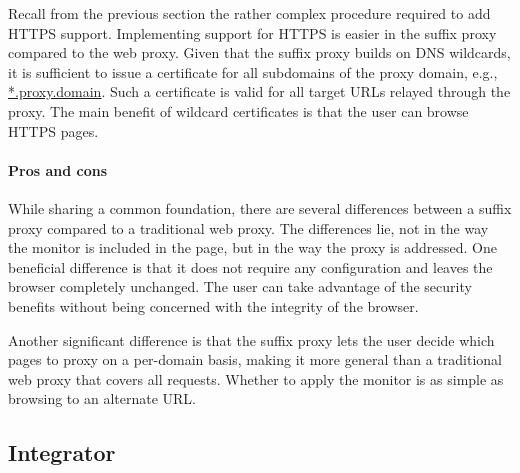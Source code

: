 \documentclass{llncs}
\newcommand{\todo}[1]{\colorbox{red}{\textcolor{white}{\sffamily\bfseries\scriptsize TODO}} \textcolor{red}{#1} \textcolor{red}{$\blacktriangleleft$}}
\begin{document}
Recall from the previous section the rather complex procedure required to add HTTPS support.
Implementing support for HTTPS is easier in the suffix proxy compared to the web proxy. 
Given that the suffix proxy builds on DNS wildcards, it is sufficient to issue a certificate
for all subdomains of the proxy domain, e.g., \url{*.proxy.domain}. Such a 
certificate is valid for all target URLs relayed through the proxy.
The main benefit of wildcard certificates is that the user can browse HTTPS pages. 

\paragraph{Pros and cons}

While sharing a common foundation, there are several differences between a 
suffix proxy compared to a traditional web proxy. The differences lie, not in 
the way the monitor is included in the page, but in the way the proxy is 
addressed. One beneficial difference is that it does not require any 
configuration and leaves the browser completely unchanged. The user can take
advantage of the security benefits without being concerned with the integrity 
of the browser.

Another significant difference is that the suffix proxy lets the user decide which pages to proxy on a 
per-domain basis, making it more general than a traditional web proxy that covers 
all requests. %
Whether to apply the monitor is as simple as browsing to an alternate URL.


\subsection{Integrator}

\end{document}
